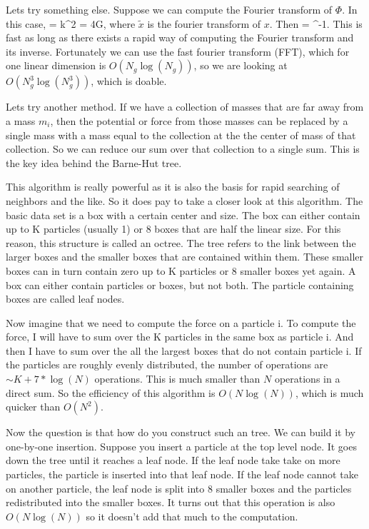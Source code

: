 Lets try something else.  Suppose we can compute the Fourier transform of $\Phi$.  In this case,
\be
    \Fourier{\gradd\Phi} = k^2\tilde{\Phi} = 4\pi G\tilde{\rho},
\ee
where $\tilde{x}$ is the fourier transform of $x$.  Then 
\be
\Phi = ^{-1}.
\ee
This is fast as long as there exists a rapid way of computing the Fourier transform and its inverse. Fortunately we can use the fast fourier transform (FFT), which for one linear dimension is $O(N_g\log(N_g))$, so we are looking at $O(N_g^3\log(N_g^3))$, which is doable. 

Lets try another method.  If we have a collection of masses that are far away from a mass $m_i$, then the potential or force from those masses can be replaced by a single mass with a mass equal to the collection at the the center of mass of that collection. So we can reduce our sum over that collection to a single sum. This is the key idea behind the Barne-Hut tree. 

This algorithm is really powerful as it is also the basis for rapid searching of neighbors and the like.  So it does pay to take a closer look at this algorithm. The basic data set is a box with a certain center and size.  The box can either contain up to K particles (usually 1) or 8 boxes that are half the linear size. For this reason, this structure is called an octree. The tree refers to the link between the larger boxes and the smaller boxes that are contained within them.  These smaller boxes can in turn contain zero up to K particles or 8 smaller boxes yet again. A box can either contain particles or boxes, but not both.  The particle containing boxes are called leaf nodes.

Now imagine that we need to compute the force on a particle i.  To compute the force, I will have to sum over the K particles in the same box as particle i.  And then I have to sum over the all the largest boxes that do not contain particle i.  If the particles are roughly evenly distributed, the number of operations are $\sim K + 7*\log(N)$ operations.  This is much smaller than $N$ operations in a direct sum. So the efficiency of this algorithm is $O(N\log(N))$, which is much quicker than $O(N^2)$.

Now the question is that how do you construct such an tree.  We can build it by one-by-one insertion.  Suppose you insert a particle at the top level node.  It goes down the tree until it reaches a leaf node.  If the leaf node take take on more particles, the particle is inserted into that leaf node. If the leaf node cannot take on another particle, the leaf node is split into 8 smaller boxes and the particles redistributed into the smaller boxes. It turns out that this operation is also $O(N\log(N))$ so it doesn't add that much to the computation.


